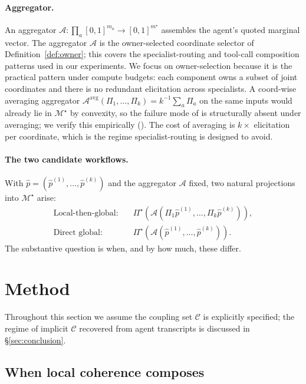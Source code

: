 \documentclass{article}
\theoremstyle{plain}
\theoremstyle{definition}
\theoremstyle{remark}
\newcommand{\Mjoint}{\mathcal{M}^{\star}}
\newcommand{\Pijoint}{\Pi^{\star}}
\newcommand{\Aagg}{\mathcal{A}}
\newcommand{\Cset}{\mathcal{C}}
\newcommand{\hpK}{\hat p}
\begin{document}
\paragraph{Aggregator.}
An aggregator
$\Aagg: \prod_a [0,1]^{m_a} \to [0,1]^{m^\star}$ assembles the
agent's quoted marginal vector. The aggregator $\Aagg$ is the
owner-selected coordinate selector of Definition~\ref{def:owner}; this
covers the specialist-routing and tool-call composition patterns
used in our experiments. We focus on owner-selection because it is the
practical pattern under compute budgets: each component owns a
subset of joint coordinates and there is no redundant elicitation
across specialists. A coord-wise averaging aggregator
$\Aagg^\mathrm{avg}(\Pi_1,\dots,\Pi_k) = k^{-1}\sum_a \Pi_a$ on the same
inputs would already lie in $\Mjoint$ by convexity, so the failure
mode of  is structurally absent under averaging; we
verify this empirically (). The cost of averaging is
$k\times$ elicitation per coordinate, which is the regime
specialist-routing is designed to avoid.

\paragraph{The two candidate workflows.}
With $\hpK = (\hpK^{(1)},\dots,\hpK^{(k)})$ and the aggregator $\Aagg$
fixed, two natural projections into $\Mjoint$ arise:
\begin{align}
\text{Local-then-global:}\quad
& \Pijoint(\Aagg(\Pi_1\hpK^{(1)},\dots,\Pi_k\hpK^{(k)})), \label{eq:LtG}\\
\text{Direct global:}\quad
& \Pijoint(\Aagg(\hpK^{(1)},\dots,\hpK^{(k)})). \label{eq:DG}
\end{align}
The substantive question is when, and by how much, these differ.

\section{Method}
\label{sec:compose}

Throughout this section we assume the coupling set $\Cset$ is
explicitly specified; the regime of implicit $\Cset$ recovered
from agent transcripts is discussed in \S\ref{sec:conclusion}.

\subsection{When local coherence composes}
\label{subsec:dichotomy}
\end{document}
